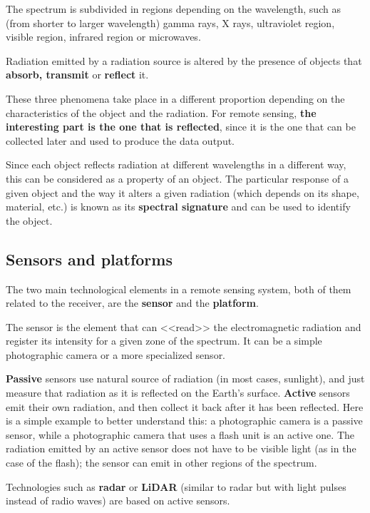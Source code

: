 The spectrum is subdivided in regions depending on the wavelength, such as (from shorter to larger wavelength) gamma rays, X rays, ultraviolet region, visible region, infrared region or microwaves.


Radiation emitted by a radiation source is altered by the presence of objects that \textbf{absorb, transmit} or \textbf{reflect} it.

These three phenomena take place in a different proportion depending on the characteristics of the object and the radiation. For remote sensing, \textbf{the interesting part is the one that is reflected}, since it is the one that can be collected later and used to produce the data output.

Since each object reflects radiation at different wavelengths in a different way, this can be considered as a property of an object. The particular response of a given object and the way it alters a given radiation (which depends on its shape, material, etc.) is known as its \textbf{spectral signature} and can be used to identify the object.


\subsection{Sensors and platforms}

The two main technological elements in a remote sensing system, both of them related to the receiver, are the \textbf{sensor} and the \textbf{platform}.

The sensor is the element that can <<read>> the electromagnetic radiation and register its intensity for a given zone of the spectrum. It can be a simple photographic camera or a more specialized sensor.

\textbf{Passive} sensors use natural source of radiation (in most cases, sunlight), and just measure that radiation as it is reflected on the Earth's surface. \textbf{Active} sensors emit their own radiation, and then collect it back after it has been reflected. Here is a simple example to better understand this: a photographic camera is a passive sensor, while a photographic camera that uses a flash unit is an active one. The radiation emitted by an active sensor does not have to be visible light (as in the case of the flash); the sensor can emit in other regions of the spectrum.

Technologies such as \textbf{radar} or \textbf{LiDAR} (similar to radar but with light pulses instead of radio waves) are based on active sensors.

